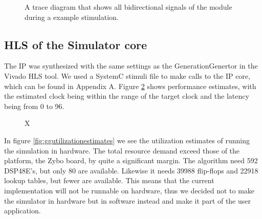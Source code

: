 \begin{figure}[htbp]
	\centering
	\caption{A trace diagram that shows all bidirectional signals of the module during a example stimulation.}
	\label{fig:generationgeneratortrace}
\end{figure}

\subsection{HLS of the Simulator core}

The IP was synthesized with the same settings as the GenerationGenertor in the Vivado HLS tool. We used a SystemC stimuli file to make calls to the IP core, which can be found in Appendix A. Figure \ref{fig:simperformanceestimates} shows performance estimates, with the estimated clock being within the range of the target clock and the latency being from  0 to 96. 

\begin{figure}[htbp]
	\centering
	\caption{X}
	\label{fig:simperformanceestimates}
\end{figure}

In figure \ref{fig:ggutilizationestimates} we see the utilization estimates of running the simulation in hardware. The total resource demand exceed those of the platform, the Zybo board, by quite a significant margin. The algorithm need 592 DSP48E's, but only 80 are available. Likewise it needs 39988 flip-flops and 22918 lookup tables, but fewer are available. This means that the current implementation will not be runnable on hardware, thus we decided not to make the simulator in hardware but in software instead and make it part of the user application.

